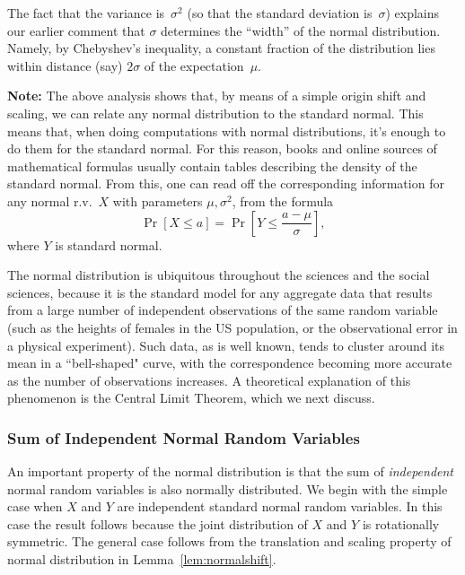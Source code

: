 \documentclass[11pt]{article}
\begin{document}
The fact that the variance is~$\sigma^2$ (so that the standard deviation is~$\sigma$)
explains our earlier comment that $\sigma$ determines the ``width'' of the normal
distribution.  Namely, by Chebyshev's inequality, a constant fraction of the distribution
lies within distance (say) $2\sigma$ of the expectation~$\mu$.

{\bf Note:} The above analysis shows that, by means of a simple origin shift and scaling,
we can relate any normal distribution to the standard normal.  This means that, when doing
computations with normal distributions, it's enough to do them for the standard normal.
For this reason, books and online sources of mathematical formulas usually contain tables
describing the density of the standard normal.  From this, one can read off the corresponding
information for any normal r.v.~$X$ with parameters $\mu,\sigma^2$, from the formula $$
   \Pr[X\le a] = \Pr[Y\le {\textstyle\frac{a-\mu}{\sigma}}],  $$
where $Y$ is standard normal.

The normal distribution is ubiquitous throughout the sciences and
the social sciences, because it is the standard model for any
aggregate data that results from a large number of independent
observations of the same random variable (such as the heights of
females in the US population, or the observational error in a
physical experiment). Such data, as is well known, tends to cluster
around its mean in a ``bell-shaped" curve, with the correspondence
becoming more accurate as the number of observations increases. A
theoretical explanation of this phenomenon is the Central Limit
Theorem, which we next discuss.


\subsubsection*{Sum of Independent Normal Random Variables}

An important property of the normal distribution is that the sum of {\em independent}
normal random variables is also normally distributed. We begin with the simple case when
$X$ and $Y$ are independent standard normal random variables. In this case the result follows
because the joint distribution of $X$ and $Y$ is rotationally symmetric. The general case follows
from the translation and scaling property of normal distribution in Lemma~\ref{lem:normalshift}.
\end{document}
